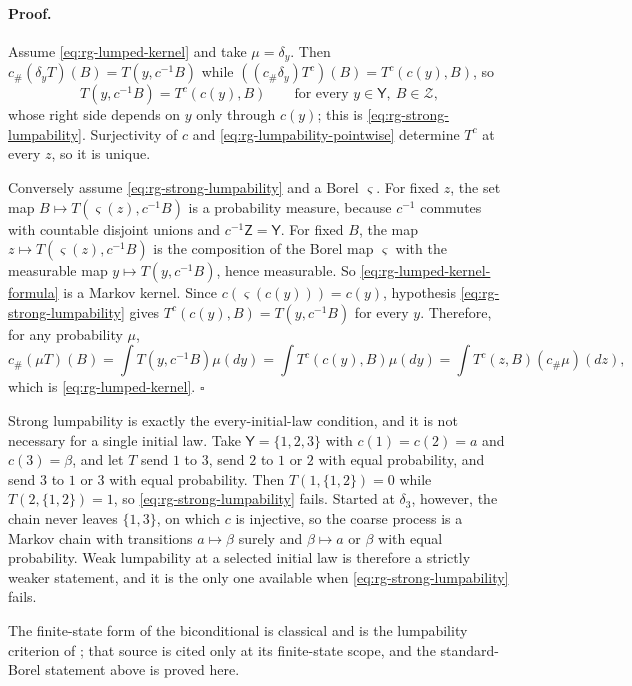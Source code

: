 \paragraph{Proof.}
Assume \eqref{eq:rg-lumped-kernel} and take $\mu=\delta_y$.  Then
$c_\#(\delta_yT)(B)=T(y,c^{-1}B)$ while
$((c_\#\delta_y)T^c)(B)=T^c(c(y),B)$, so
\begin{equation}
T(y,c^{-1}B)=T^c(c(y),B)
\qquad\text{for every }y\in\mathsf Y,\ B\in\mathscr Z,
\label{eq:rg-lumpability-pointwise}
\end{equation}
whose right side depends on $y$ only through $c(y)$; this is
\eqref{eq:rg-strong-lumpability}.  Surjectivity of $c$ and
\eqref{eq:rg-lumpability-pointwise} determine $T^c$ at every $z$, so it is
unique.

Conversely assume \eqref{eq:rg-strong-lumpability} and a Borel $\varsigma$.  For
fixed $z$, the set map $B\mapsto T(\varsigma(z),c^{-1}B)$ is a probability
measure, because $c^{-1}$ commutes with countable disjoint unions and
$c^{-1}\mathsf Z=\mathsf Y$.  For fixed $B$, the map
$z\mapsto T(\varsigma(z),c^{-1}B)$ is the composition of the Borel map
$\varsigma$ with the measurable map $y\mapsto T(y,c^{-1}B)$, hence measurable.
So \eqref{eq:rg-lumped-kernel-formula} is a Markov kernel.  Since
$c(\varsigma(c(y)))=c(y)$, hypothesis \eqref{eq:rg-strong-lumpability} gives
$T^c(c(y),B)=T(y,c^{-1}B)$ for every $y$.  Therefore, for any probability
$\mu$,
\[
c_\#(\mu T)(B)
=\int T(y,c^{-1}B)\mu(dy)
=\int T^c(c(y),B)\mu(dy)
=\int T^c(z,B)(c_\#\mu)(dz),
\]
which is \eqref{eq:rg-lumped-kernel}.  $\square$

Strong lumpability is exactly the every-initial-law condition, and it is not
necessary for a single initial law.  Take $\mathsf Y=\{1,2,3\}$ with
$c(1)=c(2)=a$ and $c(3)=\beta$, and let $T$ send $1$ to $3$, send $2$ to $1$ or
$2$ with equal probability, and send $3$ to $1$ or $3$ with equal probability.
Then $T(1,\{1,2\})=0$ while $T(2,\{1,2\})=1$, so
\eqref{eq:rg-strong-lumpability} fails.  Started at $\delta_3$, however, the
chain never leaves $\{1,3\}$, on which $c$ is injective, so the coarse process is
a Markov chain with transitions $a\mapsto\beta$ surely and
$\beta\mapsto a$ or $\beta$ with equal probability.  Weak lumpability at a
selected initial law is therefore a strictly weaker statement, and it is the
only one available when \eqref{eq:rg-strong-lumpability} fails.

The finite-state form of the biconditional is classical and
is the lumpability criterion of \citet[Ch.~6]{KemenySnell1976}; that source is
cited only at its finite-state scope, and the standard-Borel statement above is
proved here. 

